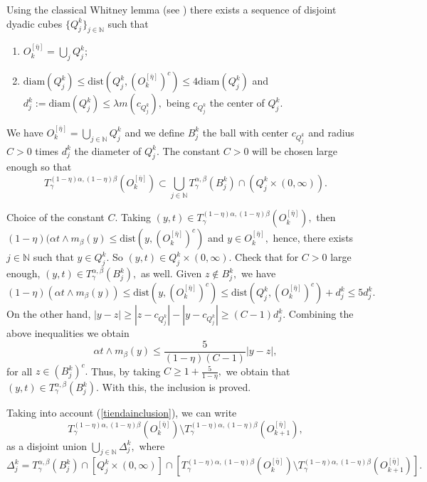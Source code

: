 \documentclass[leqno,11pt]{amsart}
\theoremstyle{plain}
\theoremstyle{remark}
\begin{document}
{{{Using the classical Whitney lemma (see \cite{Stein-Singular integrals and differentiability properties}) there exists a sequence of disjoint dyadic cubes $\{Q_j^k\}_{j\in {\mathbb N}}$ such that 

\begin{enumerate} 
\item $O_k^{[\bar{\eta}]}=\bigcup_j Q_j^k;$
\item $\text{diam} (Q_j^k)\le \text{dist}(Q_j^k, (O_k^{[\bar{\eta}]})^c)\le 4 \text{diam}(Q_j^k)$ and $d_j^k:=\text{diam}(Q_j^k)\le \lambda m (c_{Q_j^k}),$ being $c_{Q_j^k}$ the center of $Q_j^k.$
\end{enumerate}


 We have $O_k^{[\bar{\eta}]}=\bigcup_{j\in {\mathbb N}}Q_j^k$ and we define $B_j^k$ the ball with center $c_{Q_j^k}$ and radius $C>0$ times $d_j^k$ the diameter of $Q_j^k.$ The constant $C>0$ will be chosen large enough so that 
\begin{equation}\label{tiendainclusion}T^{(1-\eta)\alpha, (1-\eta)\beta}_\gamma(O_k^{[\bar{\eta}]})\subset \bigcup_{j\in {\mathbb N}}T^{\alpha, \beta}_\gamma(B_j^k)\cap (Q_j^k\times (0,\infty)).\end{equation} 

Choice of the constant $C$. Taking $(y,t)\in T^{(1-\eta)\alpha, (1-\eta)\beta}_\gamma(O_k^{[\bar{\eta}]}),$ then $(1-\eta)(\alpha t\wedge m_\beta(y)\le \text{dist}(y, (O_k^{[\bar{\eta}]})^c)$ and $y\in O_k^{[\bar{\eta}]},$ hence, there exists $j\in {\mathbb N}$ such that $y\in Q_j^k.$ So $(y,t)\in Q_j^k\times (0,\infty).$ Check that for $C>0$ large enough, $(y,t)\in T_\gamma^{\alpha, \beta}(B_j^{k}),$ as well. Given $z\notin B_j^k,$ we have $$(1-\eta)(\alpha t\wedge m_\beta (y))\le \text{dist}(y, (O_k^{[\bar{\eta}]})^c)\le \text{dist}(Q_j^k,(O_k^{[\bar{\eta}]})^c)+d_j^k\le 5 d_j^k.$$ On the other hand, $|y-z|\ge |z-c_{Q_j^k}|-|y-c_{Q_j^k}|\ge (C-1)d_j^k.$ Combining the above inequalities we obtain
$$\alpha t\wedge m_\beta (y)\le \frac{5}{(1-\eta)(C-1)}|y-z|,$$ for all $z\in (B_j^k)^c.$ Thus, by taking $C\ge 1+\frac{5}{1-\eta},$ we obtain that $(y,t)\in T_\gamma^{\alpha, \beta}(B_j^k).$ With this, the inclusion is proved.

Taking into account (\ref{tiendainclusion}), we can write $$T^{(1-\eta)\alpha, (1-\eta)\beta}_\gamma(O_k^{[\bar{\eta}]})\setminus T_\gamma^{(1-\eta)\alpha, (1-\eta)\beta}(O_{k+1}^{[\bar{\eta}]}),$$ as a disjoint union $\bigcup_{j\in {\mathbb N}}\Delta_j^k,$
where $$\Delta_j^k=T_\gamma^{\alpha, \beta}(B_j^k)\cap [Q_j^k\times (0,\infty)]\cap [T^{(1-\eta)\alpha, (1-\eta)\beta}_\gamma(O_k^{[\bar{\eta}]})\setminus T_\gamma^{(1-\eta)\alpha, (1-\eta)\beta}(O_{k+1}^{[\bar{\eta}]})].$$

}}}
\end{document}
